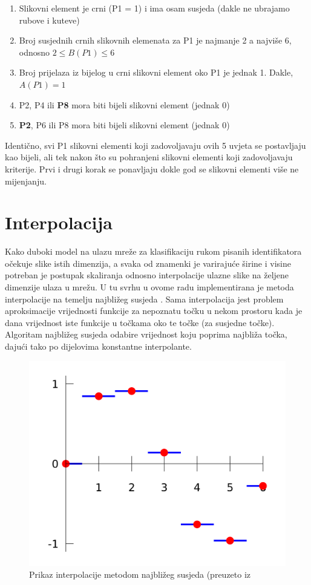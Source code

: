 \documentclass[times, utf8, diplomski]{fer}
\theoremstyle{definition}
\begin{document}
\begin{enumerate}
\item Slikovni element je crni (P1 = 1) i ima osam susjeda (dakle ne ubrajamo rubove i kuteve)
\item Broj susjednih crnih slikovnih elemenata za P1 je najmanje 2 a najviše 6, odnosno $2\leq B(P1)\leq6$
\item Broj prijelaza iz bijelog u crni slikovni element oko P1 je jednak 1. Dakle, $A(P1) = 1$
\item P2, P4 ili \textbf{P8} mora biti bijeli slikovni element (jednak 0)
\item \textbf{P2}, P6 ili P8 mora biti bijeli slikovni element (jednak 0)
\end{enumerate}

Identično, svi P1 slikovni elementi koji zadovoljavaju ovih 5 uvjeta se postavljaju kao bijeli, ali tek nakon što su pohranjeni slikovni elementi koji zadovoljavaju kriterije. Prvi i drugi korak se ponavljaju dokle god se slikovni elementi više ne mijenjanju.


\section{Interpolacija}
Kako duboki model na ulazu mreže za klasifikaciju rukom pisanih identifikatora očekuje slike istih dimenzija, a svaka od znamenki je varirajuće širine i visine potreban je postupak skaliranja odnosno interpolacije ulazne slike na željene dimenzije ulaza u mrežu. U tu svrhu u ovome radu implementirana je metoda interpolacije na temelju najbližeg susjeda . Sama interpolacija jest problem aproksimacije vrijednosti funkcije za nepoznatu točku u nekom prostoru kada je dana vrijednost iste funkcije u točkama oko te točke (za susjedne točke). Algoritam najbližeg susjeda odabire vrijednost koju poprima najbliža točka, dajući tako po dijelovima konstantne interpolante. 

\begin{figure}[h]
\centering
\includegraphics[scale=0.09]{n_n_interpolation.png}
\caption{Prikaz interpolacije metodom najbližeg susjeda (preuzeto iz \cite{interpolation:xxx}}
\end{figure}
\end{document}
